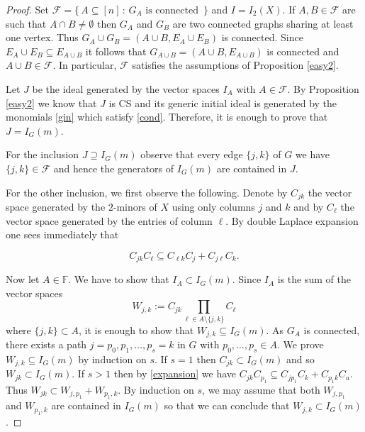 \documentclass[10pt,a4paper]{amsart}
\def\FF{\mathbb{F}}
\begin{document}
\begin{proof} 
Set   $\mathcal F=\big\{\, A\subseteq [n]\, :\, G_A \text{ is connected }\,\}$ and  $I=I_2(X)$.  
If $A,B \in \mathcal F$ are
such that $A \cap B \neq \emptyset$ then $G_A$ and $G_B$ are two
connected graphs sharing at least one vertex. Thus 
$G_A \cup G_B = (A \cup B, E_A \cup E_B)$ is connected. Since
$E_A \cup E_B \subseteq E_{A \cup B}$ it follows that
$G_{A \cup B} = (A \cup B,E_{A\cup B})$ is connected and
$A \cup B \in \mathcal F$. In particular, $\mathcal F$
satisfies the assumptions of Proposition \ref{easy2}.

Let $J$ be the ideal generated by the vector spaces $I_A$ with $A\in \mathcal F$. By Proposition \ref{easy2} we know that $J$ is CS and 
its generic initial ideal is generated by the monomials \eqref{gin}
which satisfy \eqref{cond}. Therefore, it is enough to prove that $J=I_G(m)$. 

For the inclusion $J\supseteq I_G(m)$ observe that every edge $\{j,k\}$ of $G$ we have  $\{j,k\}\in \mathcal F$ and hence the generators of $I_G(m)$ are contained in $J$.  

For the other inclusion, we first observe the following. 
Denote by $C_{jk}$ the vector space  generated by the $2$-minors of $X$ using only columns $j$ and $k$ and by $C_\ell$ the vector space generated by the entries of column $\ell$. By double Laplace expansion one sees immediately that 

\begin{equation}
\label{expansion} 
 C_{jk} C_{\ell} \subseteq C_{\ell k} C_{j}  +  C_{j \ell} C_{k} .
\end{equation} 

Now let $A\in \FF$. We have to show that $I_A\subset I_G(m)$.   Since  $I_A$ is the sum of the vector spaces 
$$W_{j,k}:=C_{jk}\prod_{\ell\in A\setminus\{j,k\} }C_\ell$$ 
where $ \{j,k\}\subset A$, it is enough to show that $W_{j,k}\subseteq I_G(m)$.  As $G_A$ is connected, there exists a path $j=p_0,p_1,\dots, p_s=k$ in $G$ with $p_0,\ldots,p_s\in A$. 
We prove $W_{j,k} \subseteq I_G(m)$ by induction on $s$. 
If $s=1$ then $C_{jk} \subset I_G(m)$ and so $W_{jk} \subset  I_G(m)$. If $s>1$ then
by \eqref{expansion} we have
$C_{jk}C_{p_1}\subseteq C_{jp_1}C_{k}+C_{p_1k}C_{a}$. 
Thus  
$W_{jk} \subset W_{j,p_1}+W_{p_1,k}$. By induction on $s$, we may assume that both $W_{j,p_1}$ and $W_{p_1,k}$ are contained in $I_G(m)$ so that we can conclude that 
$W_{j,k}\subset   I_G(m)$. 
  \end{proof}  
\end{document}
